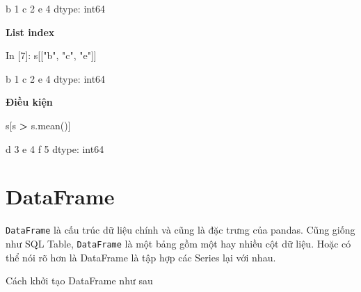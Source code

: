 \documentclass[
]{book}
\newenvironment{Shaded}{\begin{snugshade}}{\end{snugshade}}
\newcommand{\DecValTok}[1]{\textcolor[rgb]{0.00,0.00,0.81}{#1}}
\newcommand{\NormalTok}[1]{#1}
\newcommand{\OperatorTok}[1]{\textcolor[rgb]{0.81,0.36,0.00}{\textbf{#1}}}
\newcommand{\StringTok}[1]{\textcolor[rgb]{0.31,0.60,0.02}{#1}}
\begin{document}
\begin{Shaded}
\begin{Highlighting}[]
\NormalTok{b    }\DecValTok{1}
\NormalTok{c    }\DecValTok{2}
\NormalTok{e    }\DecValTok{4}
\NormalTok{dtype: int64}
\end{Highlighting}
\end{Shaded}

\textbf{List index}

\begin{Shaded}
\begin{Highlighting}[]
\NormalTok{In [}\DecValTok{7}\NormalTok{]: s[[}\StringTok{"b"}\NormalTok{, }\StringTok{"c"}\NormalTok{, }\StringTok{"e"}\NormalTok{]]}
\end{Highlighting}
\end{Shaded}

\begin{Shaded}
\begin{Highlighting}[]
\NormalTok{b    }\DecValTok{1}
\NormalTok{c    }\DecValTok{2}
\NormalTok{e    }\DecValTok{4}
\NormalTok{dtype: int64}
\end{Highlighting}
\end{Shaded}

\textbf{Điều kiện}

\begin{Shaded}
\begin{Highlighting}[]
\NormalTok{s[s }\OperatorTok{\textgreater{}}\NormalTok{ s.mean()]}
\end{Highlighting}
\end{Shaded}

\begin{Shaded}
\begin{Highlighting}[]
\NormalTok{d    }\DecValTok{3}
\NormalTok{e    }\DecValTok{4}
\NormalTok{f    }\DecValTok{5}
\NormalTok{dtype: int64}
\end{Highlighting}
\end{Shaded}

\section{DataFrame}\label{cach-khoi-tao-data-frame}

\texttt{DataFrame} là cấu trúc dữ liệu chính và cũng là đặc trưng của pandas. Cũng giống như SQL Table,
\texttt{DataFrame} là một bảng gồm một hay nhiều cột dữ liệu. Hoặc có thể nói rõ hơn là DataFrame là tập
hợp các Series lại với nhau.

Cách khởi tạo DataFrame như sau
\end{document}
